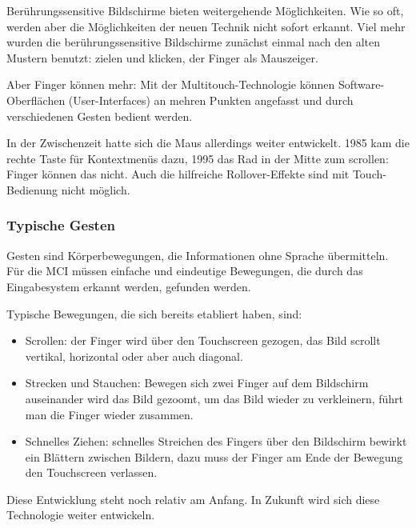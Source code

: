 Berührungssensitive Bildschirme bieten weitergehende Möglichkeiten. Wie so oft, werden aber die Möglichkeiten der neuen Technik nicht sofort erkannt. Viel mehr wurden die berührungssensitive Bildschirme zunächst einmal nach den alten Mustern benutzt: zielen und klicken, der Finger als Mauszeiger.
 
Aber Finger können mehr: Mit der Multitouch-Technologie können Software-Oberflächen (User-Interfaces) an mehren Punkten angefasst und durch verschiedenen Gesten bedient werden.

In der Zwischenzeit hatte sich die Maus allerdings weiter entwickelt. 1985 kam die rechte Taste für Kontextmenüs dazu, 1995 das Rad in der Mitte zum scrollen: Finger können das nicht. Auch die hilfreiche Rollover-Effekte sind mit Touch-Bedienung nicht möglich.

\subsubsection*{Typische Gesten}
Gesten sind Körperbewegungen, die Informationen ohne Sprache übermitteln.
Für die MCI müssen einfache und eindeutige Bewegungen, die durch das Eingabesystem erkannt werden, gefunden werden.

Typische Bewegungen, die sich bereits etabliert haben, sind: 
\begin{itemize}
\item Scrollen: der Finger wird über den Touchscreen gezogen, das Bild scrollt vertikal, horizontal oder aber auch diagonal. 
\item Strecken und Stauchen: Bewegen sich zwei Finger auf dem Bildschirm auseinander wird das Bild gezoomt, um das Bild wieder zu verkleinern, führt man die Finger wieder zusammen.
\item Schnelles Ziehen: schnelles Streichen des Fingers über den Bildschirm bewirkt ein Blättern zwischen Bildern, dazu muss der Finger am Ende der Bewegung den Touchscreen verlassen. 
\end{itemize}
 
Diese Entwicklung steht noch relativ am Anfang. In Zukunft wird sich diese Technologie weiter entwickeln. 
